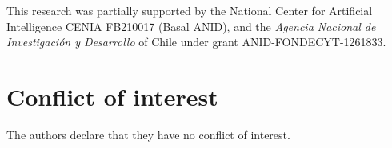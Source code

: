 \documentclass[smallextended]{svjour3}       %
\begin{document}










\begin{acknowledgements}
This research was partially supported by the National Center for Artificial Intelligence CENIA FB210017 (Basal ANID), and the \textit{Agencia Nacional de Investigación y Desarrollo} of Chile under grant ANID-FONDECYT-1261833.
\end{acknowledgements}

\section*{Conflict of interest}
The authors declare that they have no conflict of interest.



\end{document}
